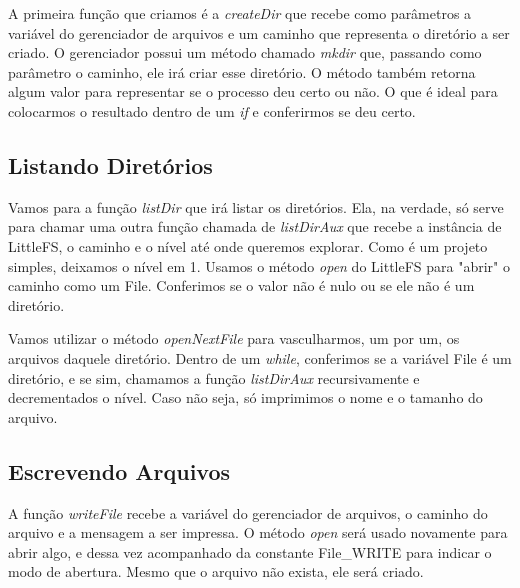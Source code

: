 \documentclass[12pt]{article}
\begin{document}
A primeira função que criamos é a \textit{createDir} que recebe como parâmetros a variável do gerenciador de arquivos e um caminho que representa o diretório a ser criado. O gerenciador possui um método chamado \textit{mkdir} que, passando como parâmetro o caminho, ele irá criar esse diretório. O método também retorna algum valor para representar se o processo deu certo ou não. O que é ideal para colocarmos o resultado dentro de um \textit{if} e conferirmos se deu certo.



\subsection{Listando Diretórios}



Vamos para a função \textit{listDir} que irá listar os diretórios. Ela, na verdade, só serve para chamar uma outra função chamada de \textit{listDirAux} que recebe a instância de LittleFS, o caminho e o nível até onde queremos explorar. Como é um projeto simples, deixamos o nível em 1. Usamos o método \textit{open} do LittleFS  para "abrir" o caminho como um File. Conferimos se o valor não é nulo ou se ele não é um diretório.



Vamos utilizar o método \textit{openNextFile} para vasculharmos, um por um, os arquivos daquele diretório. Dentro de um \textit{while}, conferimos se a variável File é um diretório, e se sim, chamamos a função \textit{listDirAux} recursivamente e decrementados o nível. Caso não seja, só imprimimos o nome e o tamanho do arquivo.



\subsection{Escrevendo Arquivos}



A função \textit{writeFile} recebe a variável do gerenciador de arquivos, o caminho do arquivo e a mensagem a ser impressa. O método \textit{open} será usado novamente para abrir algo, e dessa vez acompanhado da constante File\_WRITE para indicar o modo de abertura. Mesmo que o arquivo não exista, ele será criado.
\end{document}
